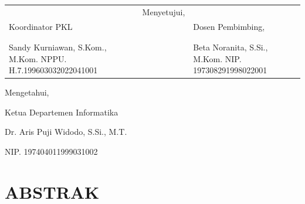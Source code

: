 \documentclass[12pt]{article}
\begin{document}
\noindent
\begin{tabularx}{\linewidth}{@{} Z l Y @{}}
                & Menyetujui, &  \\
    Koordinator PKL      &  & Dosen Pembimbing, \\ 
    \vspace*{50pt} &  & \\
    \vspace*{50pt} &  & \\
    Sandy Kurniawan, S.Kom., M.Kom. NPPU. H.7.199603032022041001 & & Beta Noranita, S.Si., M.Kom. NIP. 197308291998022001 \\
\end{tabularx}

\vspace*{40pt}


\begin{center} 
Mengetahui,

 Ketua Departemen Informatika

 \vspace*{70pt}

 Dr. Aris Puji Widodo, S.Si., M.T.

 NIP. 197404011999031002

\end{center}
% 
\newpage


\section*{ABSTRAK}
\end{document}
